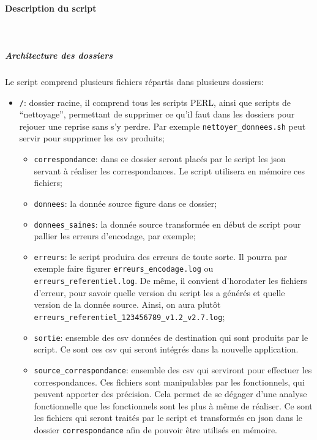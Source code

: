 \documentclass{book}
\newcommand{\myparagraph}[1]{\paragraph{#1}\mbox{}\\}
\begin{document}
\myparagraph{Description du script}
\subparagraph{Architecture des dossiers}
Le script comprend plusieurs fichiers répartis dans plusieurs dossiers:
\begin{itemize}
 \item \texttt{/}: dossier racine, il comprend tous les scripts PERL, ainsi que scripts de ``nettoyage'', permettant de supprimer ce qu'il faut dans les dossiers pour rejouer une reprise sans s'y perdre. Par exemple \texttt{nettoyer\_donnees.sh} peut servir pour supprimer les \gls{csv} produits;
 \begin{itemize}
  \item \texttt{correspondance}: dans ce dossier seront placés par le script les \gls{json} servant à réaliser les correspondances. Le script utilisera en mémoire ces fichiers;
  \item \texttt{donnees}: la donnée source figure dans ce dossier;
  \item \texttt{donnees\_saines}: la donnée source transformée en début de script pour pallier les erreurs d'encodage, par exemple;
  \item \texttt{erreurs}: le script produira des erreurs de toute sorte. Il pourra par exemple faire figurer \texttt{erreurs\_encodage.log} ou \texttt{erreurs\_referentiel.log}. De même, il convient d'horodater les fichiers d'erreur, pour savoir quelle version du script les a générés et quelle version de la donnée source. Ainsi, on aura plutôt \texttt{erreurs\_referentiel\_123456789\_v1.2\_v2.7.log};
  \item \texttt{sortie}: ensemble des \gls{csv} données de destination qui sont produits par le script. Ce sont ces \gls{csv} qui seront intégrés dans la nouvelle application.
  \item \texttt{source\_correspondance}: ensemble des \gls{csv} qui serviront pour effectuer les correspondances. Ces fichiers sont manipulables par les \gls{fonctionnels}, qui peuvent apporter des précision. Cela permet de se dégager d'une analyse fonctionnelle que les \gls{fonctionnels} sont les plus à même de réaliser. Ce sont les fichiers qui seront traités par le script et transformés en \gls{json} dans le dossier \texttt{correspondance} afin de pouvoir être utilisés en mémoire.
 \end{itemize}
\end{itemize}
\end{document}
